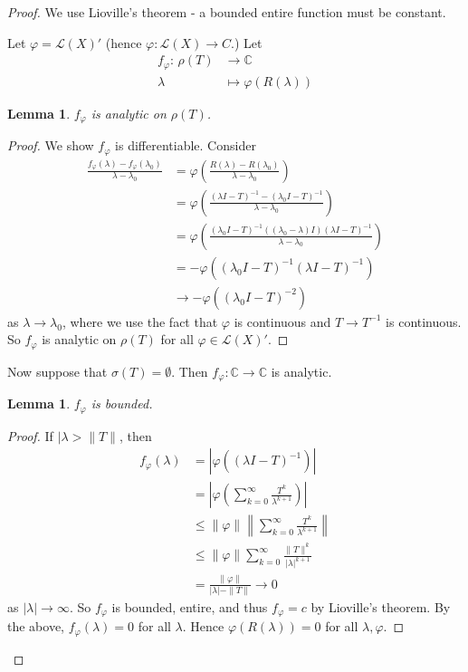 \documentclass[10pt, oneside, reqno]{amsart}
\theoremstyle{plain}%
\newtheorem{lem}[thm]{Lemma}
\theoremstyle{definition}
\theoremstyle{remark}
\newcommand{\Com}{\mathbb{C}}
\newcommand{\mapping}[5]{\begin{align*}
    #1 : \,     #2 &\rightarrow #3 \\
            #4  &\mapsto #5
\end{align*}    
}
\renewcommand{\phi}{\varphi}
\begin{document}
\begin{proof}
    We use Lioville's theorem - a bounded entire function must be constant.  
    
    Let $\phi = \mathcal L(X)'$ (hence $\phi : \mathcal L(X) \rightarrow C$.)  Let \mapping{f_\phi}{\rho(T)}{\Com}{\lambda}{\phi(R(\lambda))} 
    \begin{lem}
     $f_\phi$ is analytic on $\rho(T)$.         
    \end{lem}
    \begin{proof}
        We show $f_\phi$ is differentiable.  Consider \begin{align*}
            \frac{f_\phi(\lambda) - f_\phi(\lambda_0)}{\lambda - \lambda_0} &= \phi\left(\frac{R(\lambda) - R(\lambda_0)}{\lambda - \lambda_0} \right)  \\
            &= \phi \left( \frac{(\lambda I - T)^{-1} - (\lambda_0 I - T)^{-1}}{\lambda - \lambda_0}  \right) \\
            &= \phi \left( \frac{(\lambda_0 I - T)^{-1}( (\lambda_0 - \lambda) I)(\lambda I - T)^{-1}}{\lambda - \lambda_0} \right) \\
            &= -\phi \left( (\lambda_0 I - T)^{-1} (\lambda I - T)^{-1} \right) \\
            &\rightarrow -\phi \left( (\lambda_0 I - T)^{-2} \right)
        \end{align*} 
        as $\lambda \rightarrow \lambda_0$, where we use the fact that $\phi$ is continuous and $T \rightarrow T^{-1}$ is continuous.    So $f_\phi$ is analytic on $\rho(T)$ for all $\phi \in \mathcal L(X)'$.  
    \end{proof}
    
    Now suppose that $\sigma(T) = \emptyset$.  Then $f_\phi : \Com \rightarrow \Com$ is analytic.
    
    \begin{lem}
        $f_\phi$ is bounded.  
    \end{lem}
    \begin{proof}
        If $|\lambda > \| T \|$, then \begin{align*}
            f_\phi(\lambda) &= \left| \phi \left( ( \lambda I - T)^{-1} \right) \right| \\
                            &= \left| \phi \left( \sum_{k=0}^\infty \frac{T^k}{\lambda^{k+1}} \right) \right| \\
                            &\leq \| \phi \| \left \| \sum_{k=0}^\infty \frac{T^k}{\lambda^{k+1}} \right \| \\
                            &\leq \| \phi \| \sum_{k=0}^\infty \frac{\| T \|^k}{| \lambda|^{k+1}} \\
                            &= \frac{ \| \phi \|}{ |\lambda | - \| T \|} \rightarrow 0
        \end{align*} as $|\lambda| \rightarrow \infty$.  So $f_\phi$ is bounded, entire, and thus $f_\phi = c$ by Lioville's theorem.  By the above, $f_\phi(\lambda) = 0$ for all $\lambda$.  Hence $\phi(R(\lambda)) = 0$ for all $\lambda, \phi$.
        

\end{proof}
\end{proof}
\end{document}
